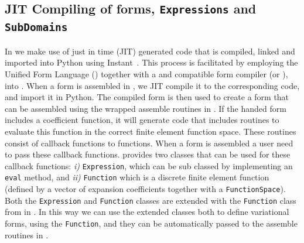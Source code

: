 \begin{code}
\section{JIT Compiling of \ufl forms, \texttt{Expressions} and \texttt{SubDomains}}
In \pydolfin we make use of just in time (JIT) generated \ufc code that is compiled, linked and imported into Python using Instant~\cite{Instant}. This process is facilitated by employing the Unified Form Language (\ufl) together with a \ufl and \ufc compatible form compiler (\ffc or \sfc), into \pydolfin. When a \ufl form is assembled in \pydolfin, we JIT compile it to the corresponding \ufc code, and import it in Python. The compiled \ufc form is then used to create a \dolfin form that can be assembled using the \swig wrapped assemble routines in \dolfin. If the handed \ufl form includes a coefficient function, it will generate \ufc code that includes routines to evaluate this function in the correct finite element function space. These routines consist of callback functions to \ufc functions. When a \ufc form is assembled a user need to pass these callback functions. \dolfin provides two classes that can be used for these callback functions: \textit{i)} \texttt{Expression}, which can be sub classed by implementing an \texttt{eval} method, and \textit{ii)} \texttt{Function} which is a discrete finite element function (defined by a vector of expansion coefficients together with a \texttt{FunctionSpace}). Both the \texttt{Expression} and \texttt{Function} classes are extended with the \texttt{Function} class from \ufl in \pydolfin. In this way we can use the extended classes both to define variational forms, using the \ufl \texttt{Function}, and they can be automatically passed to the assemble routines in \dolfin. \par


\end{code}
